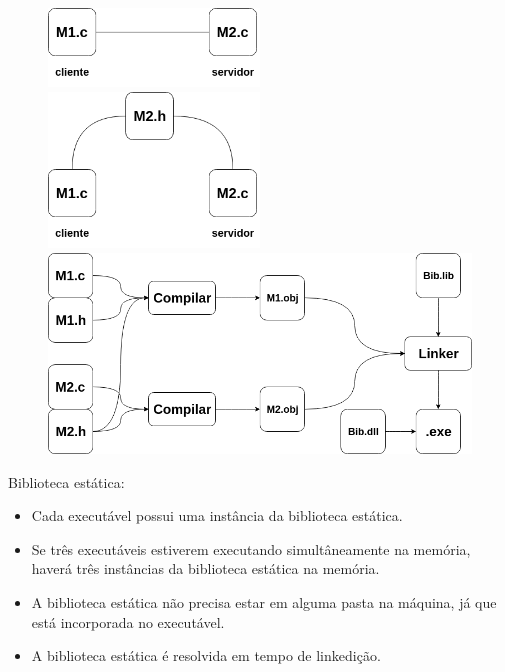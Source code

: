 \documentclass[
	12pt, %
]{fphw}
\begin{document}
\begin{doublespace}
\begin{enumerate}
        \begin{figure}[h]
            \centering
            \includegraphics[width=0.5\textwidth]{desenvolvimento1.png}
            \includegraphics[width=0.5\textwidth]{desenvolvimento2.png}
            \includegraphics[width=\textwidth]{desenvolvimento3.png}
        \end{figure}

        Biblioteca estática:

        \begin{itemize}

            \item Cada executável possui uma instância da biblioteca estática.
            \item Se três executáveis estiverem executando simultâneamente na memória, haverá três instâncias da biblioteca estática na memória.
            \item A biblioteca estática não precisa estar em alguma pasta na máquina, já que está incorporada no executável.
            \item A biblioteca estática é resolvida em tempo de linkedição.
            

\end{itemize}
\end{enumerate}
\end{doublespace}
\end{document}
